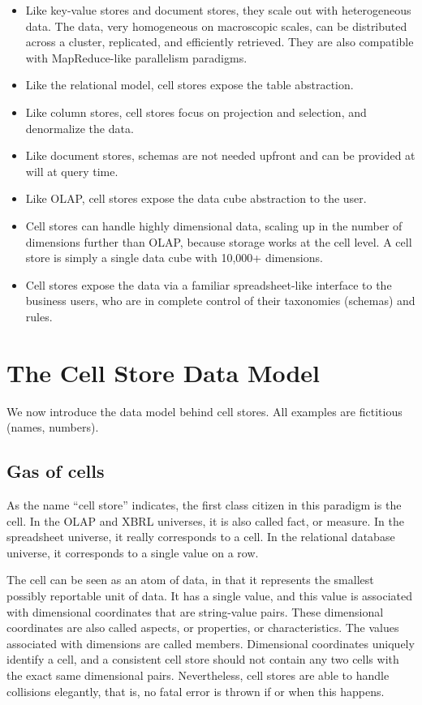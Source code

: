 \documentclass{acm_proc_article-sp}
\begin{document}
\vspace{-\topsep}
\begin{itemize}
\item Like key-value stores and document stores, they scale out with heterogeneous data. The data, very homogeneous on macroscopic scales, can be distributed across a cluster, replicated, and efficiently retrieved. They are also compatible with MapReduce-like parallelism paradigms.
\item Like the relational model, cell stores expose the table abstraction.
\item Like column stores, cell stores focus on projection and selection, and denormalize the data. 
\item Like document stores, schemas are not needed upfront and can be provided at will at query time.
\item Like OLAP, cell stores expose the data cube abstraction to the user.
\item Cell stores can handle highly dimensional data, scaling up in the number of dimensions further than OLAP, because storage works at the cell level. A cell store is simply a single data cube with 10,000+ dimensions.
\item Cell stores expose the data via a familiar spreadsheet-like interface to the business users, who are in complete control of their taxonomies (schemas) and rules.
\end{itemize}

\section{The Cell Store Data Model}
\label{section-data-model}

We now introduce the data model behind cell stores. All examples are fictitious (names, numbers).

\subsection{Gas of cells}

As the name ``cell store'' indicates, the first class citizen in this paradigm is the cell. In the OLAP and XBRL \cite{XBRL} universes, it is also called fact, or measure. In the spreadsheet universe, it really corresponds to a cell. In the relational database universe, it corresponds to a single value on a row.

The cell can be seen as an atom of data, in that it represents the smallest possibly reportable unit of data. It has a single value, and this value is associated with dimensional coordinates that are string-value pairs. These dimensional coordinates are also called aspects, or properties, or characteristics. The values associated with dimensions are called members. Dimensional coordinates uniquely identify a cell, and a consistent cell store should not contain any two cells with the exact same dimensional pairs. Nevertheless, cell stores are able to handle collisions elegantly, that is, no fatal error is thrown if or when this happens.
\end{document}
